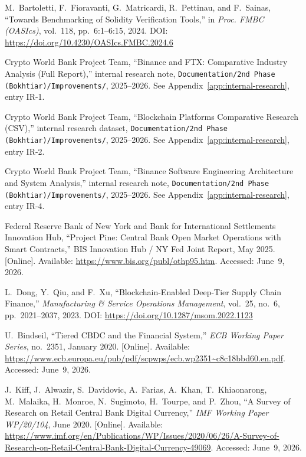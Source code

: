 \documentclass[12pt, a4paper]{report}
\begin{document}
{\begin{enumerate}[label={[\arabic*]}]
\item M.~Bartoletti, F.~Fioravanti, G.~Matricardi, R.~Pettinau, and F.~Sainas, ``Towards Benchmarking of Solidity Verification Tools,'' in \textit{Proc. FMBC (OASIcs)}, vol.~118, pp.~6:1--6:15, 2024. DOI: \url{https://doi.org/10.4230/OASIcs.FMBC.2024.6}

\item Crypto World Bank Project Team, ``Binance and FTX: Comparative Industry Analysis (Full Report),'' internal research note, \texttt{Documentation/2nd Phase (Bokhtiar)/Improvements/}, 2025--2026. See Appendix~\ref{app:internal-research}, entry IR-1.

\item Crypto World Bank Project Team, ``Blockchain Platforms Comparative Research (CSV),'' internal research dataset, \texttt{Documentation/2nd Phase (Bokhtiar)/Improvements/}, 2025--2026. See Appendix~\ref{app:internal-research}, entry IR-2.

\item Crypto World Bank Project Team, ``Binance Software Engineering Architecture and System Analysis,'' internal research note, \texttt{Documentation/2nd Phase (Bokhtiar)/Improvements/}, 2025--2026. See Appendix~\ref{app:internal-research}, entry IR-4.

\item Federal Reserve Bank of New York and Bank for International Settlements Innovation Hub, ``Project Pine: Central Bank Open Market Operations with Smart Contracts,'' BIS Innovation Hub / NY Fed Joint Report, May 2025. [Online]. Available: \url{https://www.bis.org/publ/othp95.htm}. Accessed: June~9, 2026.

\item L.~Dong, Y.~Qiu, and F.~Xu, ``Blockchain-Enabled Deep-Tier Supply Chain Finance,'' \textit{Manufacturing \& Service Operations Management}, vol.~25, no.~6, pp.~2021--2037, 2023. DOI: \url{https://doi.org/10.1287/msom.2022.1123}

\item U.~Bindseil, ``Tiered CBDC and the Financial System,'' \textit{ECB Working Paper Series}, no.~2351, January 2020. [Online]. Available: \url{https://www.ecb.europa.eu/pub/pdf/scpwps/ecb.wp2351~c8c18bbd60.en.pdf}. Accessed: June~9, 2026.

\item J.~Kiff, J.~Alwazir, S.~Davidovic, A.~Farias, A.~Khan, T.~Khiaonarong, M.~Malaika, H.~Monroe, N.~Sugimoto, H.~Tourpe, and P.~Zhou, ``A Survey of Research on Retail Central Bank Digital Currency,'' \textit{IMF Working Paper WP/20/104}, June 2020. [Online]. Available: \url{https://www.imf.org/en/Publications/WP/Issues/2020/06/26/A-Survey-of-Research-on-Retail-Central-Bank-Digital-Currency-49069}. Accessed: June~9, 2026.


\end{enumerate}}
\end{document}
